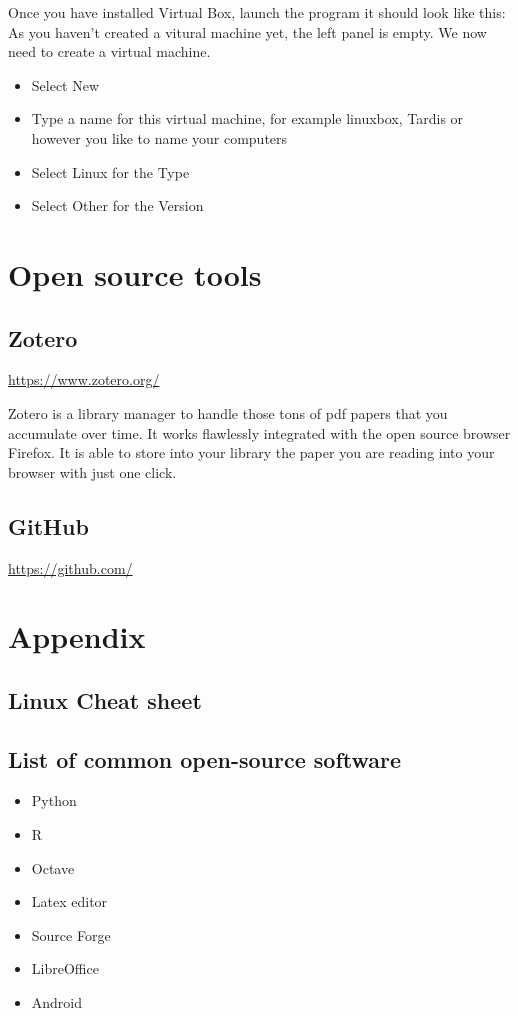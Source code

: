 \documentclass[a4paper]{article}
\begin{document}
Once you have installed Virtual Box, launch the program it should look like this:
As you haven't created a vitural machine yet, the left panel is empty. We now need to create a virtual machine. 
\begin{itemize}
\item Select New
\item Type a name for this virtual machine, for example linuxbox, Tardis or however you like to name your computers
\item Select Linux for the Type
\item Select Other for the Version
\end{itemize}

\section{Open source tools}
\subsection{Zotero}
\url{https://www.zotero.org/}

Zotero is a library manager to handle those tons of pdf papers that you accumulate over time. It works flawlessly integrated with the open source browser Firefox. It is able to store into your library the paper you are reading into your browser with just one click.\\



\subsection{GitHub}
\url{https://github.com/}
\section*{Appendix}
\subsection{Linux Cheat sheet}
\subsection{List of common open-source software} 
\begin{itemize}
\item Python %
\item R %
\item Octave 
\item Latex editor
\item Source Forge
\item LibreOffice
\item Android
\end{itemize}
\end{document}
